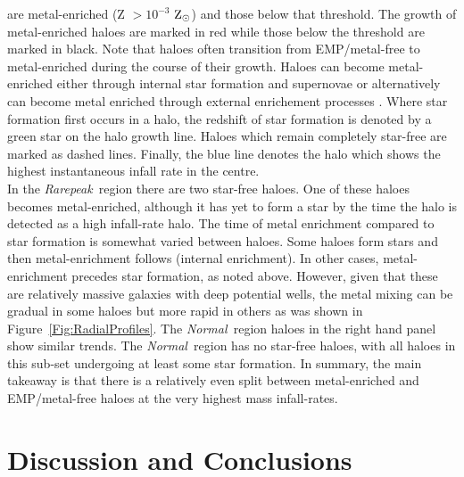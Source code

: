 \documentclass[graphics, twocolumn, usenatbib]{mn2e}
\newcommand{\zsolarc} {$\rm{Z_{\odot}}$}
\newcommand{\rarepeak} {\textit{Rarepeak~}}
\newcommand{\normal} {\textit{Normal~}}
\begin{document}
are metal-enriched (Z $> 10^{-3}$ \zsolarc) and those below that threshold. The growth of
metal-enriched haloes are marked in red while those below the threshold are marked in black. Note
that haloes often transition from EMP/metal-free to metal-enriched during the course of their growth. 
Haloes can become metal-enriched either through internal star formation and
supernovae or alternatively can become metal enriched through external enrichement processes
\citep[e.g.][]{Smith_2015}. Where star formation first
occurs in a halo, the redshift of star formation is denoted by a green star on the halo growth line. 
Haloes which remain completely star-free are marked as dashed lines. Finally, the blue line denotes
the halo which shows the highest instantaneous infall rate in the centre. \\
\indent In the \rarepeak region there are two
star-free haloes. One of these haloes becomes metal-enriched, although it has yet to form
a star by the time the halo is detected as a high infall-rate halo. The time of metal enrichment
compared to star formation is somewhat varied between haloes. Some haloes form stars and then
metal-enrichment follows (internal enrichment). In other cases, metal-enrichment precedes
star formation, as noted above.
However, given that these are relatively massive galaxies with deep potential wells,
the metal mixing can be gradual in some haloes but more rapid in others as was shown in Figure~\ref{Fig:RadialProfiles}. The \normal region haloes in the right hand panel show similar trends.
The \normal region has no star-free haloes, with all haloes in this sub-set undergoing at
least some star formation. In summary, the main takeaway is that there is a relatively even split
between metal-enriched and EMP/metal-free haloes at the very highest mass infall-rates. 

\section{Discussion and Conclusions} \label{Sec:Discussion}
\end{document}
